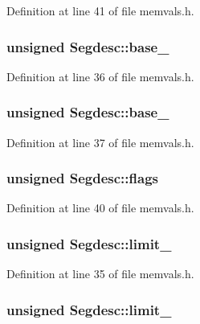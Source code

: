 \-Definition at line 41 of file memvals.\-h.

\hypertarget{structSegdesc_a9ef72e5343428076ae56aadda868e6d6}{
\subsubsection[{base\-\_\-0}]{\setlength{\rightskip}{0pt plus 5cm}unsigned {\bf \-Segdesc\-::base\-\_}}}\label{structSegdesc_a9ef72e5343428076ae56aadda868e6d6}


\-Definition at line 36 of file memvals.\-h.

\hypertarget{structSegdesc_a293c20d519e6ab9e38720e32016f7d31}{
\subsubsection[{base\-\_\-1}]{\setlength{\rightskip}{0pt plus 5cm}unsigned {\bf \-Segdesc\-::base\-\_}}}\label{structSegdesc_a293c20d519e6ab9e38720e32016f7d31}


\-Definition at line 37 of file memvals.\-h.

\hypertarget{structSegdesc_a88cc0fd4e0fc4467546577095c0ffe3e}{
\subsubsection[{flags}]{\setlength{\rightskip}{0pt plus 5cm}unsigned {\bf \-Segdesc\-::flags}}}\label{structSegdesc_a88cc0fd4e0fc4467546577095c0ffe3e}


\-Definition at line 40 of file memvals.\-h.

\hypertarget{structSegdesc_aa98356a03ede9a64a2a866c63d751b10}{
\subsubsection[{limit\-\_\-0}]{\setlength{\rightskip}{0pt plus 5cm}unsigned {\bf \-Segdesc\-::limit\-\_}}}\label{structSegdesc_aa98356a03ede9a64a2a866c63d751b10}


\-Definition at line 35 of file memvals.\-h.

\hypertarget{structSegdesc_a6ea96b5b37b07766d86d62c166363c21}{
\subsubsection[{limit\-\_\-1}]{\setlength{\rightskip}{0pt plus 5cm}unsigned {\bf \-Segdesc\-::limit\-\_}}}\label{structSegdesc_a6ea96b5b37b07766d86d62c166363c21}


